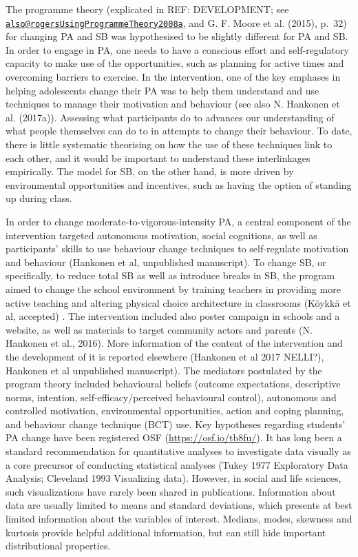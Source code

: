 \documentclass[english,floatsintext,]{apa6}
\theoremstyle{definition}
\theoremstyle{definition}
\theoremstyle{definition}
\theoremstyle{remark}
\begin{document}
The programme theory (explicated in REF: DEVELOPMENT; see
\href{mailto:also@rogersUsingProgrammeTheory2008a}{\nolinkurl{also@rogersUsingProgrammeTheory2008a}},
and G. F. Moore et al. (2015), p.~32) for changing PA and SB was
hypothesised to be slightly different for PA and SB. In order to engage
in PA, one needs to have a conscious effort and self-regulatory capacity
to make use of the opportunities, such as planning for active times and
overcoming barriers to exercise. In the intervention, one of the key
emphases in helping adolescents change their PA was to help them
understand and use techniques to manage their motivation and behaviour
(see also N. Hankonen et al. (2017a)). Assessing what participants do to
advances our understanding of what people themselves can do to in
attempts to change their behaviour. To date, there is little systematic
theorising on how the use of these techniques link to each other, and it
would be important to understand these interlinkages empirically. The
model for SB, on the other hand, is more driven by environmental
opportunities and incentives, such as having the option of standing up
during class.

In order to change moderate-to-vigorous-intensity PA, a central
component of the intervention targeted autonomous motivation, social
cognitions, as well as participants' skills to use behaviour change
techniques to self-regulate motivation and behaviour (Hankonen et al,
unpublished manuscript). To change SB, or specifically, to reduce total
SB as well as introduce breaks in SB, the program aimed to change the
school environment by training teachers in providing more active
teaching and altering physical choice architecture in classrooms (Köykkä
et al, accepted) . The intervention included also poster campaign in
schools and a website, as well as materials to target community actors
and parents (N. Hankonen et al., 2016). More information of the content
of the intervention and the development of it is reported elsewhere
(Hankonen et al 2017 NELLI?), Hankonen et al unpublished manuscript).
The mediators postulated by the program theory included behavioural
beliefs (outcome expectations, descriptive norms, intention,
self-efficacy/perceived behavioural control), autonomous and controlled
motivation, environmental opportunities, action and coping planning, and
behaviour change technique (BCT) use. Key hypotheses regarding students'
PA change have been registered OSF (\url{https://osf.io/tb8fu/}). It has
long been a standard recommendation for quantitative analyses to
investigate data visually as a core precursor of conducting statistical
analyses (Tukey 1977 Exploratory Data Analysis; Cleveland 1993
Visualizing data). However, in social and life sciences, such
visualizations have rarely been shared in publications. Information
about data are usually limited to means and standard deviations, which
presents at best limited information about the variables of interest.
Medians, modes, skewness and kurtosis provide helpful additional
information, but can still hide important distributional properties.
\end{document}
